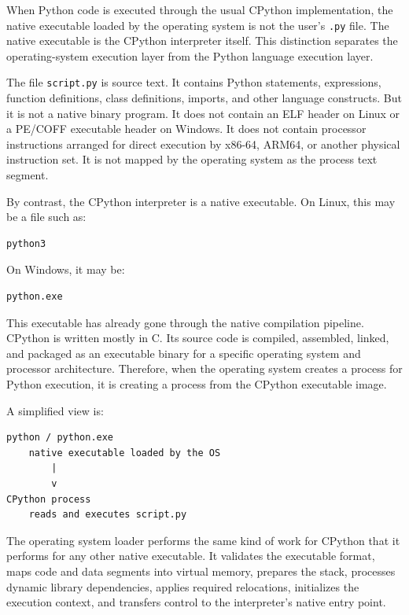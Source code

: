 \documentclass[a4paper,twoside]{report}
\begin{document}
When Python code is executed through the usual CPython implementation, the native executable loaded by the operating system is not the user's \texttt{.py} file. The native executable is the CPython interpreter itself. This distinction separates the operating-system execution layer from the Python language execution layer.

The file \texttt{script.py} is source text. It contains Python statements, expressions, function definitions, class definitions, imports, and other language constructs. But it is not a native binary program. It does not contain an ELF header on Linux or a PE/COFF executable header on Windows. It does not contain processor instructions arranged for direct execution by x86-64, ARM64, or another physical instruction set. It is not mapped by the operating system as the process text segment.

By contrast, the CPython interpreter is a native executable. On Linux, this may be a file such as:

\begin{verbatim}
python3
\end{verbatim}

On Windows, it may be:

\begin{verbatim}
python.exe
\end{verbatim}

This executable has already gone through the native compilation pipeline. CPython is written mostly in C. Its source code is compiled, assembled, linked, and packaged as an executable binary for a specific operating system and processor architecture. Therefore, when the operating system creates a process for Python execution, it is creating a process from the CPython executable image.

A simplified view is:

\begin{verbatim}
python / python.exe
    native executable loaded by the OS
        |
        v
CPython process
    reads and executes script.py
\end{verbatim}

The operating system loader performs the same kind of work for CPython that it performs for any other native executable. It validates the executable format, maps code and data segments into virtual memory, prepares the stack, processes dynamic library dependencies, applies required relocations, initializes the execution context, and transfers control to the interpreter's native entry point.
\end{document}
